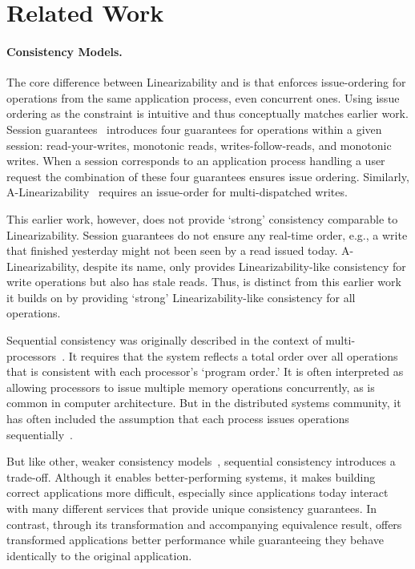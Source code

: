 \section{Related Work}
\label{sec:related}


\paragraph{Consistency Models.}
The core difference between Linearizability and \mdl{} is that \mdl{} enforces issue-ordering for operations from the same application process, even concurrent ones.
Using issue ordering as the constraint is intuitive and thus conceptually matches earlier work.
Session guarantees~\cite{terry1994session} introduces four guarantees for operations within a given session: read-your-writes, monotonic reads, writes-follow-reads, and monotonic writes. When a session corresponds to an application process handling a user request the combination of these four guarantees ensures issue ordering.
Similarly, A-Linearizability~\cite{hunt2010zookeeper} requires an issue-order for multi-dispatched writes. 

This earlier work, however, does not provide `strong' consistency comparable to Linearizability.
Session guarantees do not ensure any real-time order, e.g., a write that finished yesterday might not been seen by a read issued today.
A-Linearizability, despite its name, only provides Linearizability-like consistency for write operations but also has stale reads.
Thus, \Mdl{} is distinct from this earlier work it builds on by providing `strong' Linearizability-like consistency for all operations.

Sequential consistency was originally described in the context of
multi-processors~\cite{lamport1979sequential}. It requires that
the system reflects a total order over all operations that is 
consistent with each processor's `program order.' It is often
interpreted as allowing processors to issue multiple memory 
operations concurrently, as is common in computer architecture.
But in the distributed systems community, it has often
included the assumption that each process issues operations 
sequentially~\cite{attiya1993seqlin}.

But like other, weaker consistency
models~\cite{ahamad1995causal,lloyd2011cops,terry1995bayou,deCandia2007dynamo, antipode}, 
sequential consistency introduces a trade-off. Although it enables
better-performing systems, it makes building correct applications more difficult, especially since applications today interact with many different services that provide unique consistency guarantees. In contrast, through its transformation
and accompanying equivalence result, \MDL{} offers transformed
applications better performance while guaranteeing they behave 
identically to the original application.

